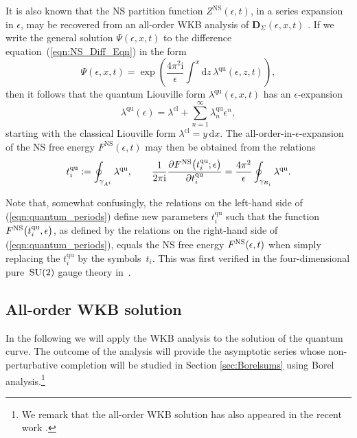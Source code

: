 \documentclass[pdftex]{sigma}
\numberwithin{equation}{section}
\begin{document}
It is also known that the NS partition function $Z^{\mathrm{NS}}(\epsilon,t)$, in a series expansion in $\epsilon$, may be recovered from an all-order WKB analysis of $\mathbf{D}_\Sigma(\epsilon,x,t)$ \cite{ACDKV, NS}. If we write the general solution $\Psi(\epsilon,x,t)$ to the difference equation~(\ref{eqn:NS_Diff_Eqn}) in the form
\begin{equation*}%
\Psi(\epsilon,x,t) = \exp \left( \frac{4 \pi^2 \mathrm{i} }{ \epsilon} \int^x \mathrm{d}z \, \lambda^{\mathrm{qu}}(\epsilon,z,t) \right),
\end{equation*}
then it follows that the quantum Liouville form $\lambda^{\mathrm{qu}}(\epsilon,x,t)$ has an $\epsilon$-expansion
\begin{equation*}
\lambda^{\mathrm{qu}}(\epsilon) = \lambda^\mathrm{cl} + \sum_{n=1}^{\infty} \lambda^{\mathrm{qu}}_n \epsilon^n,
\end{equation*}
starting with the classical Liouville form $\lambda^\mathrm{cl} = y \,\mathrm{d} x$. The all-order-in-$\epsilon$-expansion of the NS free energy $F^{\mathrm{NS}}(\epsilon,t)$ may then be obtained from the relations
\begin{equation}\label{eqn:quantum_periods}
t^{\mathrm{qu}}_i := \oint_{\gamma_{A^i}} \lambda^{\mathrm{qu}}, \qquad \frac{1}{2 \pi \mathrm{i}} \frac{\partial F^{\rm NS}\big(t^{\mathrm{qu}}_i;\epsilon\big)}{\partial t^{\mathrm{qu}}_i} = \frac{4 \pi^2}{\epsilon} \oint_{\gamma_{B_i}} \lambda^{\mathrm{qu}}.
\end{equation}


Note that, somewhat confusingly, the relations on the left-hand side of (\ref{eqn:quantum_periods}) define new parameters $t^{\mathrm{qu}}_i$ such that the function $F^{\rm NS}\big(t^{\mathrm{qu}}_i,\epsilon\big)$, as defined by the relations on the right-hand side of (\ref{eqn:quantum_periods}), equals the NS free energy $F^{\rm NS}(\epsilon,t)$ when simply replacing the $t^{\mathrm{qu}}_i$ by the symbols~$t_i$. This was first verified in the four-dimensional pure~${\rm SU}(2)$ gauge theory in~\cite{Mironov:2009uv}.

\subsection{All-order WKB solution}
In the following we will apply the WKB analysis to the solution of the quantum curve.
The outcome of the analysis will provide the asymptotic series whose non-perturbative completion will be studied in Section \ref{sec:Borelsums} using Borel analysis.\footnote{We remark that the all-order WKB solution has also appeared in the recent work \cite[Section 4]{GHN}.}
\end{document}
